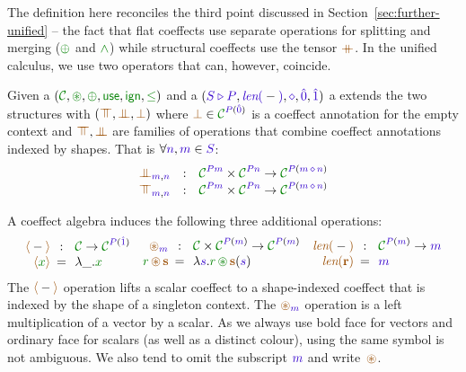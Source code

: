The definition here reconciles the third point discussed in Section~\ref{sec:further-unified} --
the fact that flat coeffects use separate operations for splitting and merging ($\cpar$ and $\czip$)
while structural coeffects use the tensor $\atimes$. In the unified calculus, we use two operators
that can, however, coincide.

\begin{definition}
\label{def:unified-alg}
Given a  $(\C, \cseq, \cpar, \cunit, \czero, \cleq)$ and a
 $(\SHP, \slen{-}, \stimes, \sempty, \sunit)$ a  extends the two structures with $(\azip, \apar, \azero)$ where $\azero \in \C^{\SP(\sempty)}$
is a coeffect annotation for the empty context and $\azip, \apar$ are families of operations that
combine coeffect annotations indexed by shapes. That is $\forall \sclrd{n},\sclrd{m} \in \SH$:
%
\begin{equation*}
\begin{array}{rcl}
\apar_{\sclrd{m},\sclrd{n}} &:& \C^{\SP \sclrd{m}} \times \C^{\SP \sclrd{n}} \rightarrow \C^{\SP (\sclrd{m}\,\stimes\,\sclrd{n})} \\
\azip_{\sclrd{m},\sclrd{n}} &:& \C^{\SP \sclrd{m}} \times \C^{\SP \sclrd{n}} \rightarrow \C^{\SP (\sclrd{m}\,\stimes\,\sclrd{n})}
\end{array}
\end{equation*}
\end{definition}

\noindent
A coeffect algebra induces the following three additional operations:
%
\begin{equation*}
\begin{array}{rclcrcl}
 \alift{-} &\narrow{:}& \C \rightarrow \C^{\SP(\sunit)}  \\
 \alift{\cclrd{x}} &\narrow{=}& \lambda \_ . \cclrd{x}   \\
\end{array}
\begin{array}{rclcrcl}
 \aseq_{\sclrd{m}} &\narrow{:}&  \C \times \C^{\SP(\sclrd{m})} \rightarrow \C^{\SP(\sclrd{m})}   \\
 \cclrd{r}\, \aseq\, \aclrd{\textbf{s}} &\narrow{=}& \lambda \sclrd{s} . \cclrd{r}\, \cseq\, \aclrd{\textbf{s}}(\sclrd{s}) \\
\end{array}
\begin{array}{rclcrcl}
 \alen{-} &\narrow{:}& \C^{\SP(\sclrd{m})} \rightarrow \sclrd{m}\\
 \alen{\aclrd{\textbf{r}}} &\narrow{=}& \sclrd{m}
\end{array}
\end{equation*}
%
The $\alift{-}$ operation lifts a scalar coeffect to a shape-indexed coeffect that is indexed by
the shape of a singleton context. The $\aseq_{\sclrd{m}}$ operation is a left multiplication of a
vector by a scalar. As we always use bold face for vectors and ordinary face for scalars (as well
as a distinct colour), using the same symbol is not ambiguous. We also tend to omit the subscript
$\sclrd{m}$ and write~$\aseq$.

